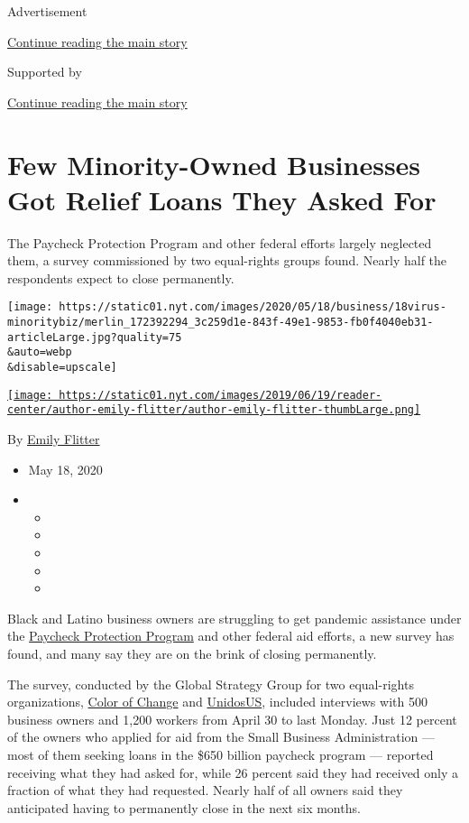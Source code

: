 Advertisement

\protect\hyperlink{after-top}{Continue reading the main story}

Supported by

\protect\hyperlink{after-sponsor}{Continue reading the main story}

\hypertarget{few-minority-owned-businesses-got-relief-loans-they-asked-for}{%
\section{Few Minority-Owned Businesses Got Relief Loans They Asked
For}\label{few-minority-owned-businesses-got-relief-loans-they-asked-for}}

The Paycheck Protection Program and other federal efforts largely
neglected them, a survey commissioned by two equal-rights groups found.
Nearly half the respondents expect to close permanently.

\texttt{[image: https://static01.nyt.com/images/2020/05/18/business/18virus-minoritybiz/merlin\_172392294\_3c259d1e-843f-49e1-9853-fb0f4040eb31-articleLarge.jpg?quality=75\\\&auto=webp\\\&disable=upscale]}

\href{https://www.nytimes.com/by/emily-flitter}{\texttt{[image: https://static01.nyt.com/images/2019/06/19/reader-center/author-emily-flitter/author-emily-flitter-thumbLarge.png]}}

By \href{https://www.nytimes.com/by/emily-flitter}{Emily Flitter}

\begin{itemize}
\item
  May 18, 2020
\item
  \begin{itemize}
  \item
  \item
  \item
  \item
  \item
  \end{itemize}
\end{itemize}

Black and Latino business owners are struggling to get pandemic
assistance under the
\href{https://www.nytimes.com/2020/06/10/business/Small-business-loans-ppp.html}{Paycheck
Protection Program} and other federal aid efforts, a new survey has
found, and many say they are on the brink of closing permanently.

The survey, conducted by the Global Strategy Group for two equal-rights
organizations, \href{https://colorofchange.org/}{Color of Change} and
\href{https://www.unidosus.org/}{UnidosUS}, included interviews with 500
business owners and 1,200 workers from April 30 to last Monday. Just 12
percent of the owners who applied for aid from the Small Business
Administration --- most of them seeking loans in the \$650 billion
paycheck program --- reported receiving what they had asked for, while
26 percent said they had received only a fraction of what they had
requested. Nearly half of all owners said they anticipated having to
permanently close in the next six months.


